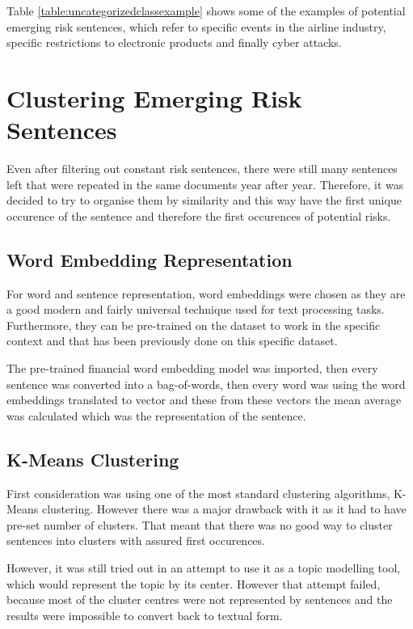 {Table \ref{table:uncategorizedclassexample} shows some of the examples of potential emerging risk sentences, which refer to specific events in the airline industry, specific restrictions to electronic products and finally cyber attacks.

\section{Clustering Emerging Risk Sentences}
Even after filtering out constant risk sentences, there were still many sentences left that were repeated in the same documents year after year. Therefore, it was decided to try to organise them by similarity and this way have the first unique occurence of the sentence and therefore the first occurences of potential risks.

\subsection{Word Embedding Representation}
\label{sec:wordembeddingsentenceuse}
For word and sentence representation, word embeddings were chosen as they are a good modern and fairly universal technique used for text processing tasks. Furthermore, they can be pre-trained on the dataset to work in the specific context and that has been previously done on this specific dataset. 

The pre-trained financial word embedding model \cite{10kwordembeddings} was imported, then every sentence was converted into a bag-of-words, then every word was using the word embeddings translated to vector and these from these vectors the mean average was calculated which was the representation of the sentence.

\subsection{K-Means Clustering}
First consideration was using one of the most standard clustering algorithms, K-Means clustering. However there was a major drawback with it as it had to have pre-set number of clusters. That meant that there was no good way to cluster sentences into clusters with assured first occurences.

However, it was still tried out in an attempt to use it as a topic modelling tool, which would represent the topic by its center. However that attempt failed, because most of the cluster centres were not represented by sentences and the results were impossible to convert back to textual form.

}
